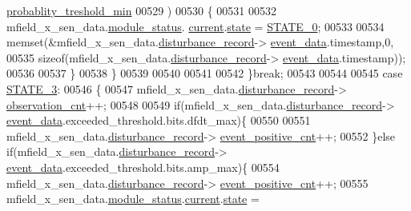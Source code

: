 \begin{DoxyCode}
      \hyperlink{a00021_aa59261f74183d4f9e909ac425e0bea35}{probablity\_treshold\_min}
00529                            )
00530                          \{
00531 
00532                              mfield\_x\_sen\_data.\hyperlink{a00025_adfab5a5d8b45a93dfb13edb24e2b80e3}{module\_status}.
      \hyperlink{a00019_acf41ffc11da291c2f9f0fcb02ee72b98}{current}.\hyperlink{a00019_a6b8d8e916bc56265a3fd279bd26b6d1b}{state} = \hyperlink{a00021_ad6739dbbe5581cac99b7dc8a5e09949c}{STATE\_0};
00533 
00534                              memset(&mfield\_x\_sen\_data.\hyperlink{a00025_ac9b38e2c1d3f1013a88d33506c754152}{disturbance\_record}->
      \hyperlink{a00028_a8c0bda69e71ef674e60da47ad0be9ab0}{event\_data}.timestamp,0,
00535                                      \textcolor{keyword}{sizeof}(mfield\_x\_sen\_data.\hyperlink{a00025_ac9b38e2c1d3f1013a88d33506c754152}{disturbance\_record}->
      \hyperlink{a00028_a8c0bda69e71ef674e60da47ad0be9ab0}{event\_data}.timestamp));
00536 
00537                         \}
00538              \}
00539 
00540 
00541 
00542         \}\textcolor{keywordflow}{break};
00543 
00544 
00545         \textcolor{keywordflow}{case} \hyperlink{a00021_ad87f1bc8466a25d9f7da68717d324a22}{STATE\_3}: 
00546         \{
00547             mfield\_x\_sen\_data.\hyperlink{a00025_ac9b38e2c1d3f1013a88d33506c754152}{disturbance\_record}->
      \hyperlink{a00028_ad5b0bac02ce266b91b2b52a1c3ea1d78}{observation\_cnt}++;
00548 
00549             \textcolor{keywordflow}{if}(mfield\_x\_sen\_data.\hyperlink{a00025_ac9b38e2c1d3f1013a88d33506c754152}{disturbance\_record}->
      \hyperlink{a00028_a8c0bda69e71ef674e60da47ad0be9ab0}{event\_data}.exceeded\_threshold.bits.dfdt\_max)\{
00550 
00551                mfield\_x\_sen\_data.\hyperlink{a00025_ac9b38e2c1d3f1013a88d33506c754152}{disturbance\_record}->
      \hyperlink{a00028_a7397b9d76d4b57500f27bb23d258a18a}{event\_positive\_cnt}++;
00552             \}\textcolor{keywordflow}{else}  \textcolor{keywordflow}{if}(mfield\_x\_sen\_data.\hyperlink{a00025_ac9b38e2c1d3f1013a88d33506c754152}{disturbance\_record}->
      \hyperlink{a00028_a8c0bda69e71ef674e60da47ad0be9ab0}{event\_data}.exceeded\_threshold.bits.amp\_max)\{
00554                mfield\_x\_sen\_data.\hyperlink{a00025_ac9b38e2c1d3f1013a88d33506c754152}{disturbance\_record}->
      \hyperlink{a00028_a7397b9d76d4b57500f27bb23d258a18a}{event\_positive\_cnt}++;
00555                mfield\_x\_sen\_data.\hyperlink{a00025_adfab5a5d8b45a93dfb13edb24e2b80e3}{module\_status}.\hyperlink{a00019_acf41ffc11da291c2f9f0fcb02ee72b98}{current}.\hyperlink{a00019_a6b8d8e916bc56265a3fd279bd26b6d1b}{state} = 

\end{DoxyCode}
